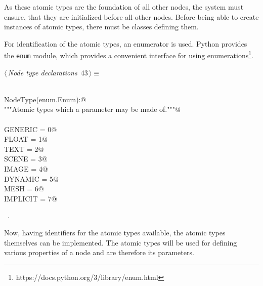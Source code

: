 \documentclass[
    a4paper,      %
    10pt,         %
    openright,    %
    notitlepage,  %
    parskip=half, %
]{scrreprt}       %
\theoremstyle{definition}                    %
\begin{document}
As these atomic types are the foundation of all other nodes, the system must
ensure, that they are initialized before all other nodes. Before being able to
create instances of atomic types, there must be classes defining them.

For identification of the atomic types, an enumerator is used. Python provides
the \verb+enum+ module, which provides a convenient interface for using
enumerations\footnote{https://docs.python.org/3/library/enum.html}.

\begin{flushleft} \small
\begin{minipage}{\linewidth}\label{scrap54}\raggedright\small
{} $\langle\,${\itshape Node type declarations}\nobreak\ {\footnotesize {43}}$\,\rangle\equiv$
\vspace{-1ex}
\begin{list}{}{} \item
\mbox{}\lstinline@@\\
\mbox{}\lstinline@class NodeType(enum.Enum):@\\
\mbox{}\lstinline@    """Atomic types which a parameter may be made of."""@\\
\mbox{}\lstinline@@\\
\mbox{}\lstinline@    GENERIC  = 0@\\
\mbox{}\lstinline@    FLOAT    = 1@\\
\mbox{}\lstinline@    TEXT     = 2@\\
\mbox{}\lstinline@    SCENE    = 3@\\
\mbox{}\lstinline@    IMAGE    = 4@\\
\mbox{}\lstinline@    DYNAMIC  = 5@\\
\mbox{}\lstinline@    MESH     = 6@\\
\mbox{}\lstinline@    IMPLICIT = 7@\\
\mbox{}\lstinline@@{\NWsep}
\end{list}
\vspace{-1.5ex}
\footnotesize
\begin{list}{}{\setlength{\itemsep}{-\parsep}\setlength{\itemindent}{-\leftmargin}}
\item \NWtxtMacroRefIn\ .

\item{}
\end{list}
\end{minipage}\vspace{4ex}
\end{flushleft}
Now, having identifiers for the atomic types available, the atomic types
themselves can be implemented. The atomic types will be used for defining
various properties of a node and are therefore its parameters.
\end{document}
